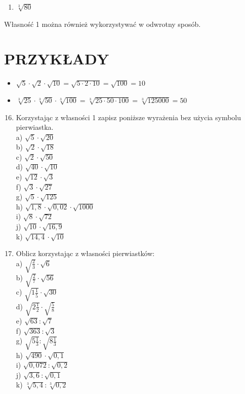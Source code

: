 \documentclass[10pt]{article}
\begin{document}
\begin{enumerate}
  \item \(\sqrt[3]{80}\)
\end{enumerate}

Własność 1 można również wykorzystywać w odwrotny sposób.

\section*{PRZYKŁADY}
\begin{itemize}
  \item \(\sqrt{5} \cdot \sqrt{2} \cdot \sqrt{10}=\sqrt{5 \cdot 2 \cdot 10}=\sqrt{100}=10\)
  \item \(\sqrt[3]{25} \cdot \sqrt[3]{50} \cdot \sqrt[3]{100}=\sqrt[3]{25 \cdot 50 \cdot 100}=\sqrt[3]{125000}=50\)
\end{itemize}

\begin{enumerate}
  \setcounter{enumi}{15}
  \item Korzystając z własności 1 zapisz poniższe wyrażenia bez użycia symbolu pierwiastka.\\
a) \(\sqrt{5} \cdot \sqrt{20}\)\\
b) \(\sqrt{2} \cdot \sqrt{18}\)\\
c) \(\sqrt{2} \cdot \sqrt{50}\)\\
d) \(\sqrt{40} \cdot \sqrt{10}\)\\
e) \(\sqrt{12} \cdot \sqrt{3}\)\\
f) \(\sqrt{3} \cdot \sqrt{27}\)\\
g) \(\sqrt{5} \cdot \sqrt{125}\)\\
h) \(\sqrt{1,8} \cdot \sqrt{0,02} \cdot \sqrt{1000}\)\\
i) \(\sqrt{8} \cdot \sqrt{72}\)\\
j) \(\sqrt{10} \cdot \sqrt{16,9}\)\\
k) \(\sqrt{14,4} \cdot \sqrt{10}\)
  \item Oblicz korzystając z własności pierwiastków:\\
a) \(\sqrt{\frac{2}{3}} \cdot \sqrt{6}\)\\
b) \(\sqrt{\frac{2}{7}} \cdot \sqrt{56}\)\\
c) \(\sqrt{1 \frac{1}{5}} \cdot \sqrt{30}\)\\
d) \(\sqrt{2 \frac{1}{2}} \cdot \sqrt{\frac{5}{8}}\)\\
e) \(\sqrt{63}: \sqrt{7}\)\\
f) \(\sqrt{363}: \sqrt{3}\)\\
g) \(\sqrt{5 \frac{1}{3}}: \sqrt{8 \frac{1}{3}}\)\\
h) \(\sqrt{490} \cdot \sqrt{0,1}\)\\
i) \(\sqrt{0,072}: \sqrt{0,2}\)\\
j) \(\sqrt{3,6}: \sqrt{0,1}\)\\
k) \(\sqrt[3]{5,4}: \sqrt[3]{0,2}\)
\end{enumerate}
\end{document}
